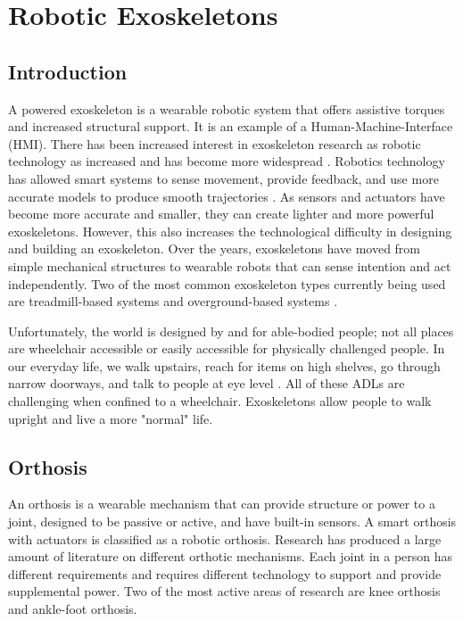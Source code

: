 \section{Robotic Exoskeletons}
\label{sec:ExoBack}
\subsection{Introduction}

A powered exoskeleton is a wearable robotic system that offers assistive torques and increased structural support. It is an example of a Human-Machine-Interface (HMI). There has been increased interest in exoskeleton research as robotic technology as increased and has become more widespread \cite{aliman2017design} \cite{chen2016recent} \cite{mertz2012next} \cite{gardner2017review}. Robotics technology has allowed smart systems to sense movement, provide feedback, and use more accurate models to produce smooth trajectories \cite{5462998}. As sensors and actuators have become more accurate and smaller, they can create lighter and more powerful exoskeletons. However, this also increases the technological difficulty in designing and building an exoskeleton. Over the years, exoskeletons have moved from simple mechanical structures to wearable robots that can sense intention and act independently. Two of the most common exoskeleton types currently being used are treadmill-based systems and overground-based systems \cite{diaz2011lower}.

Unfortunately, the world is designed by and for able-bodied people; not all places are wheelchair accessible or easily accessible for physically challenged people. In our everyday life, we walk upstairs, reach for items on high shelves, go through narrow doorways, and talk to people at eye level \cite{welage2011wheelchair}. All of these ADLs are challenging when confined to a wheelchair. Exoskeletons allow people to walk upright and live a more "normal" life. 


\subsection{Orthosis}

An orthosis is a wearable mechanism that can provide structure or power to a joint, designed to be passive or active, and have built-in sensors. A smart orthosis with actuators is classified as a robotic orthosis. Research has produced a large amount of literature on different orthotic mechanisms. Each joint in a person has different requirements and requires different technology to support and provide supplemental power. Two of the most active areas of research are knee orthosis and ankle-foot orthosis. 


